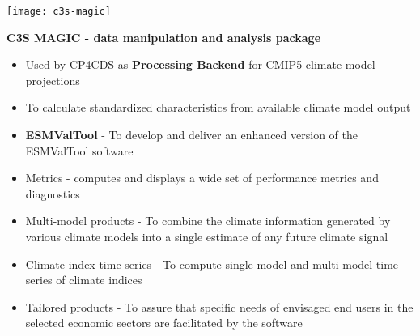 \documentclass[portrait,a0paper,fontscale=0.4]{baposter} %
\newcommand{\compresslist}{%
\setlength{\itemsep}{1pt}%
\setlength{\parskip}{0pt}%
\setlength{\parsep}{0pt}%
}
\begin{document}
\begin{poster}
{  \begin{minipage}{0.4\textwidth}
    \texttt{[image: c3s-magic]}
  \end{minipage}
  \begin{minipage}{0.6\textwidth}
    {\bf C3S MAGIC - data manipulation and analysis package}
    \begin{itemize}\compresslist
      \item Used by CP4CDS as {\bf Processing Backend} for CMIP5 climate model projections
      \item To calculate standardized characteristics
          from available climate model output
      \item {\bf ESMValTool} - To develop and deliver an enhanced version of the ESMValTool software
      \item Metrics - computes and displays a wide set of performance metrics and diagnostics
      \item Multi-model products - To combine the climate information generated by various climate models
        into a single estimate of any future climate signal
      \item Climate index time-series - To compute single-model and multi-model time series of climate indices
      \item Tailored products - To assure that specific needs of envisaged end users in the selected economic
        sectors
        are facilitated by the software
    \end{itemize}
 \end{minipage}

}

\end{poster}
\end{document}
